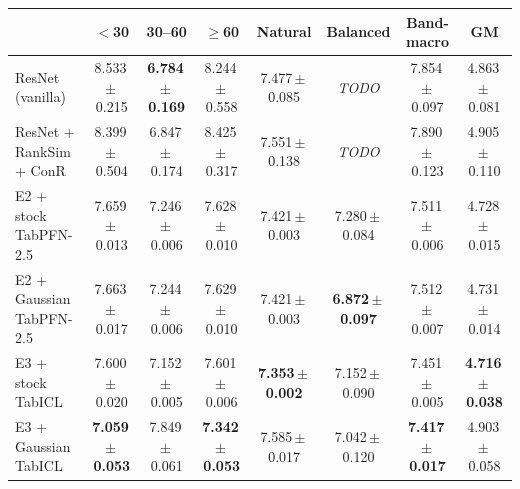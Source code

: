 \begin{tabular}{lccccccc}
\toprule
 & $<$30 & 30--60 & $\geq$60 & Natural & Balanced & Band-macro & GM \\
\midrule
ResNet (vanilla) & 8.533\,$\pm$\,0.215 & \textbf{6.784\,$\pm$\,0.169} & 8.244\,$\pm$\,0.558 & 7.477\,$\pm$\,0.085 & \textit{TODO} & 7.854\,$\pm$\,0.097 & 4.863\,$\pm$\,0.081 \\
ResNet + RankSim + ConR & 8.399\,$\pm$\,0.504 & 6.847\,$\pm$\,0.174 & 8.425\,$\pm$\,0.317 & 7.551\,$\pm$\,0.138 & \textit{TODO} & 7.890\,$\pm$\,0.123 & 4.905\,$\pm$\,0.110 \\
E2 + stock TabPFN-2.5 & 7.659\,$\pm$\,0.013 & 7.246\,$\pm$\,0.006 & 7.628\,$\pm$\,0.010 & 7.421\,$\pm$\,0.003 & 7.280\,$\pm$\,0.084 & 7.511\,$\pm$\,0.006 & 4.728\,$\pm$\,0.015 \\
E2 + Gaussian TabPFN-2.5 & 7.663\,$\pm$\,0.017 & 7.244\,$\pm$\,0.006 & 7.629\,$\pm$\,0.010 & 7.421\,$\pm$\,0.003 & \textbf{6.872\,$\pm$\,0.097} & 7.512\,$\pm$\,0.007 & 4.731\,$\pm$\,0.014 \\
E3 + stock TabICL & 7.600\,$\pm$\,0.020 & 7.152\,$\pm$\,0.005 & 7.601\,$\pm$\,0.006 & \textbf{7.353\,$\pm$\,0.002} & 7.152\,$\pm$\,0.090 & 7.451\,$\pm$\,0.005 & \textbf{4.716\,$\pm$\,0.038} \\
E3 + Gaussian TabICL & \textbf{7.059\,$\pm$\,0.053} & 7.849\,$\pm$\,0.061 & \textbf{7.342\,$\pm$\,0.053} & 7.585\,$\pm$\,0.017 & 7.042\,$\pm$\,0.120 & \textbf{7.417\,$\pm$\,0.017} & 4.903\,$\pm$\,0.058 \\
\bottomrule
\end{tabular}
